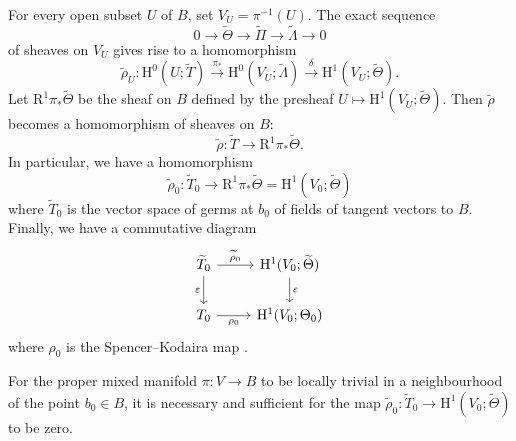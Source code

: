 \documentclass{article}
\theoremstyle{plain}
\newenvironment{theorem}[1]
    {\renewcommand\theinnercustomtheorem{#1}\innercustomtheorem}
    {\endinnercustomtheorem}
\theoremstyle{definition}
\newcommand{\HH}{\mathrm{H}}
\newcommand{\oldpage}[1]{\marginpar{\footnotesize$\Big\vert$ \textit{p.~#1}}}
\begin{document}
For every open subset $U$ of $B$, set $V_U=\pi^{-1}(U)$.
The exact sequence
\[
  0 \to \widetilde{\Theta} \to \widetilde{\Pi} \to \widetilde{\Lambda} \to 0
\]
of sheaves on $V_U$ gives rise to a homomorphism
\[
  \widetilde{\rho}_U\colon
  \HH^0(U;\widetilde{T})
  \xrightarrow{\pi_*} \HH^0(V_U;\widetilde{\Lambda})
  \xrightarrow{\delta} \HH^1(V_U;\widetilde{\Theta}).
\]
Let $\mathrm{R}^1\pi_*\widetilde{\Theta}$ be the sheaf on $B$ defined by the presheaf $U\mapsto\HH^1(V_U;\widetilde{\Theta})$.
Then $\widetilde{\rho}$ becomes a homomorphism of sheaves on $B$:
\[
  \widetilde{\rho}\colon \widetilde{T} \to \mathrm{R}^1\pi_*\widetilde{\Theta}.
\]
In particular, we have a homomorphism
\[
  \widetilde{\rho}_0\colon
  \widetilde{T}_0
  \to \mathrm{R}^1\pi_*\widetilde{\Theta}
  = \HH^1(V_0;\widetilde{\Theta})
\]
where $\widetilde{T}_0$ is the vector space of germs at $b_0$ of fields of tangent vectors to $B$.
Finally, we have a commutative diagram
\oldpage{3-02}
\[
  \begin{tikzcd}
    \widetilde{T}_0 \rar["\widetilde{\rho}_0"] \dar[swap,"\varepsilon"]
    & \HH^1(V_0;\widetilde{\Theta}) \dar["\varepsilon"]
  \\T_0 \rar[swap,"\rho_0"]
    & \HH^1(V_0;\Theta_0)
  \end{tikzcd}
\]
where $\rho_0$ is the Spencer--Kodaira map \cite{2}.

\begin{theorem}{1}
\label{theorem1}
  For the proper mixed manifold $\pi\colon V\to B$ to be locally trivial in a neighbourhood of the point $b_0\in B$, it is necessary and sufficient for the map $\widetilde{\rho}_0\colon\widetilde{T}_0\to\HH^1(V_0;\widetilde{\Theta})$ to be zero.
\end{theorem}
\end{document}
